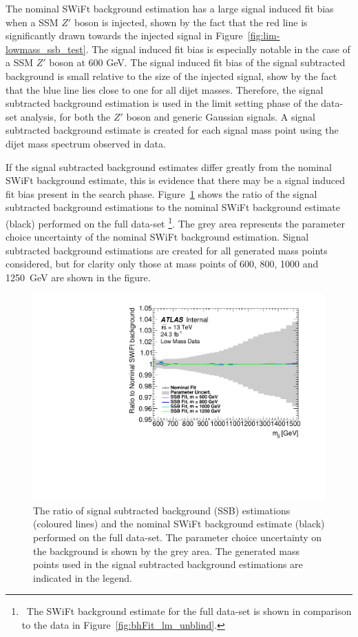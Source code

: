 The nominal SWiFt background estimation has a large signal induced fit bias when a SSM $Z'$ boson is injected,
shown by the fact that the red line is significantly drawn towards the injected signal in Figure~\ref{fig:lim-lowmass_ssb_test}.
The signal induced fit bias is especially notable in the case of a SSM $Z'$ boson at 600 GeV.
The signal induced fit bias of the signal subtracted background is small relative to the size of the injected signal,
show by the fact that the blue line lies close to one for all dijet masses.
Therefore, the signal subtracted background estimation is used in the limit setting phase of the \lm{} data-set analysis,
for both the $Z'$ boson and generic Gaussian signals.
A signal subtracted background estimate is created for each signal mass point using the dijet mass spectrum observed in data.

If the signal subtracted background estimates differ greatly from the nominal SWiFt background estimate,
this is evidence that there may be a signal induced fit bias present in the search phase.
Figure~\ref{fig:lim-lowmass_ssb_data} shows the ratio of the 
signal subtracted background estimations to the nominal SWiFt background estimate (black) performed on the full \lm{} data-set
\footnote{\ The SWiFt background estimate for the full data-set is shown in comparison to the data in Figure~\ref{fig:bhFit_lm_unblind}.}.
The grey area represents the parameter choice uncertainty of the nominal SWiFt background estimation.
Signal subtracted background estimations are created for all generated mass points considered,
but for clarity only those at mass points of 600, 800, 1000 and 1250~GeV are shown in the figure.

\begin{figure}[!htb]
  \begin{center}
    \includegraphics[width=0.6\linewidth, angle=0]{figs/Dibjet/LowMass/lim-ssb_data.pdf}
  \end{center}
  \vspace{-1em}
  \caption[The ratio of signal subtracted background estimations
    and the SWiFt background estimate performed on the full \lm{} data-set.]
          {The ratio of signal subtracted background (SSB) estimations (coloured lines)
    and the nominal SWiFt background estimate (black) performed on the full \lm{} data-set.
    The parameter choice uncertainty on the background is shown by the grey area.
    The generated mass points used in the signal subtracted background estimations are indicated in the legend.}
  \label{fig:lim-lowmass_ssb_data}
\end{figure}

